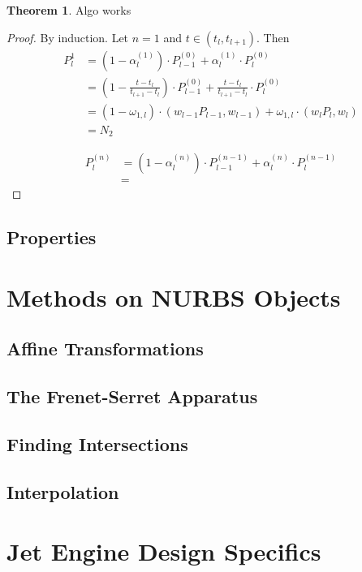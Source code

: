 \documentclass[a4paper, 11pt]{report}
\theoremstyle{definition}
\newtheorem{theorem}[definition]{Theorem}
\begin{document}
\begin{theorem}
	Algo works
\end{theorem}
\begin{proof}
	By induction. Let $n = 1$ and $t \in (t_l, t_{l+1})$. Then
	\begin{align*}
		P_l^{1} &= (1-\alpha_l^{(1)}) \cdot P_{l-1}^{(0)} + \alpha_l^{(1)} \cdot P_l^{(0)} \\
				&= \left(1-\frac{t-t_l}{t_{l+1}-t_l}\right) \cdot P_{l-1}^{(0)} + \frac{t-t_l}{t_{l+1}-t_l} \cdot P_l^{(0)} \\
				&= (1-\omega_{1,l}) \cdot (w_{l-1} P_{l-1}, w_{l-1}) + \omega_{1,l} \cdot (w_l P_l, w_l) \\
				&= N_2
	\end{align*}
	
	\begin{align*}
		P^{(n)}_l 	&= (1-\alpha_l^{(n)}) \cdot P_{l-1}^{(n-1)} + \alpha_l^{(n)} \cdot P_l^{(n-1)} \\
					&= 
	\end{align*}

\end{proof}


\subsection{Properties}


\section{Methods on NURBS Objects}
\subsection{Affine Transformations}
\subsection{The Frenet-Serret Apparatus}
\subsection{Finding Intersections}
\subsection{Interpolation}

\section{Jet Engine Design Specifics}
\end{document}

